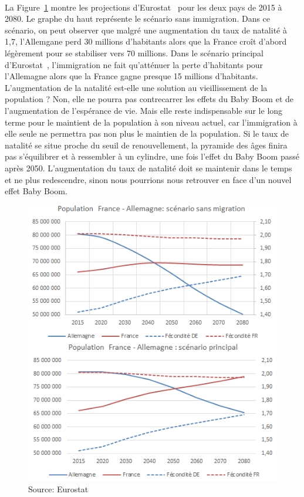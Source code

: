 \paragraph{}La Figure~\ref{FR-DE_natalite.png} montre les projections d’Eurostat~\citep{eurostat_europop13} pour les deux pays de 2015 à 2080. Le graphe du haut représente le scénario sans immigration. Dans ce scénario, on peut observer que malgré une augmentation du taux de natalité à 1,7, l’Allemgane perd 30 millions d’habitants alors que la France croît d’abord légèrement pour se stabiliser vers 70 millions. Dans le scénario principal d'Eurostat~\citep{eurostat_europop13}, l'immigration ne fait qu’atténuer la perte d’habitants pour l’Allemagne alors que la France gagne presque 15 millions d’habitants. L’augmentation de la natalité est-elle une solution au vieillissement de la population ? Non, elle ne pourra pas contrecarrer les effets du Baby Boom et de l’augmentation de l’espérance de vie. Mais elle reste indispensable sur le long terme pour le maintient de la population à son niveau actuel, car l’immigration à elle seule ne permettra pas non plus le maintien de la population. Si le taux de natalité se situe proche du seuil de renouvellement, la pyramide des âges finira pas s'équilibrer et à ressembler à un cylindre, une fois l’effet du Baby Boom passé après 2050. L’augmentation du taux de natalité doit se maintenir dans le temps et ne plus redescendre, sinon nous pourrions nous retrouver en face d’un nouvel effet Baby Boom. 
\newpage
\begin{figure}[h!]
    \begin{center}
        \includegraphics[scale=1]{document/FR-DE_natalite.png}
        \caption{Source: Eurostat~\citep{eurostat_europop13}}
        \label{FR-DE_natalite.png}
    \end{center}
\end{figure}

